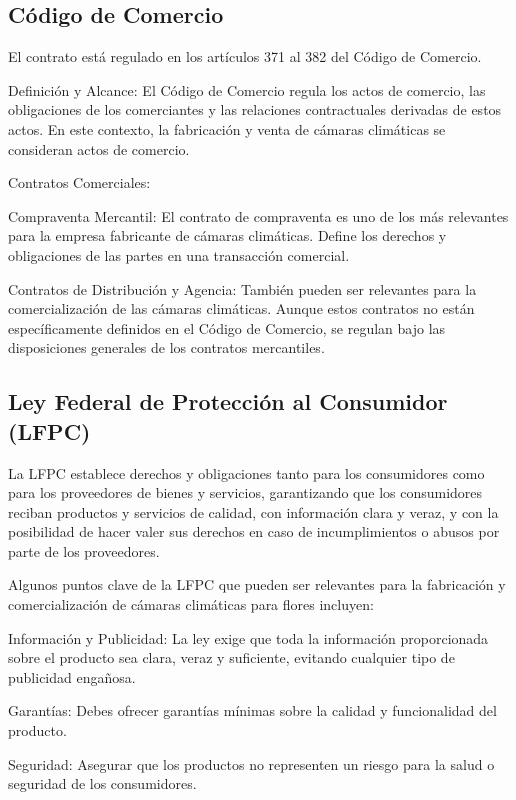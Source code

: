 \subsection{Código de Comercio}

El contrato está regulado en los artículos 371 al 382 del Código de Comercio.

Definición y Alcance: El Código de Comercio regula los actos de comercio, las obligaciones de los comerciantes y las relaciones contractuales derivadas de estos actos. En este contexto, la fabricación y venta de cámaras climáticas se consideran actos de comercio.

Contratos Comerciales:

Compraventa Mercantil: El contrato de compraventa es uno de los más relevantes para la empresa fabricante de cámaras climáticas.  Define los derechos y obligaciones de las partes en una transacción comercial.

Contratos de Distribución y Agencia: También pueden ser relevantes para la comercialización de las cámaras climáticas. Aunque estos contratos no están específicamente definidos en el Código de Comercio, se regulan bajo las disposiciones generales de los contratos mercantiles.




 \subsection{Ley Federal de Protección al Consumidor (LFPC)}

La LFPC establece derechos y obligaciones tanto para los consumidores como para los proveedores de bienes y servicios, garantizando que los consumidores reciban productos y servicios de calidad, con información clara y veraz, y con la posibilidad de hacer valer sus derechos en caso de incumplimientos o abusos por parte de los proveedores.

Algunos puntos clave de la LFPC que pueden ser relevantes para la fabricación y comercialización de cámaras climáticas para flores incluyen:

Información y Publicidad: La ley exige que toda la información proporcionada sobre el producto sea clara, veraz y suficiente, evitando cualquier tipo de publicidad engañosa.

Garantías: Debes ofrecer garantías mínimas sobre la calidad y funcionalidad del producto.

Seguridad: Asegurar que los productos no representen un riesgo para la salud o seguridad de los consumidores.

